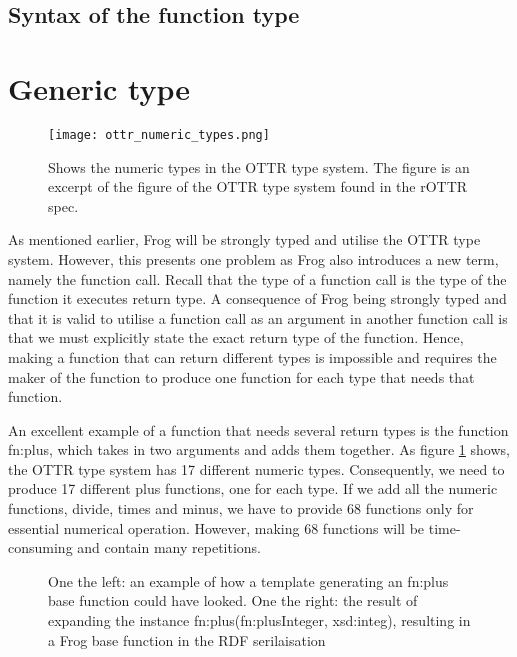 \subsection{Syntax of the function type}

\section{Generic type}

\begin{figure}[b]
    \centering
    \texttt{[image: ottr\_numeric\_types.png]}
    \caption{Shows the numeric types in the OTTR type system. The figure is an excerpt of the figure of the OTTR type system found in the rOTTR spec\cite{OTTR_rOTTR}.}
    \label{fig:ottr_numeric_types}
\end{figure}

As mentioned earlier, Frog will be strongly typed and utilise the OTTR type system. However, this presents one problem as Frog also introduces a new term, namely the function call. Recall that the type of a function call is the type of the function it executes return type. A consequence of Frog being strongly typed and that it is valid to utilise a function call as an argument in another function call is that we must explicitly state the exact return type of the function. Hence, making a function that can return different types is impossible and requires the maker of the function to produce one function for each type that needs that function. 

\para
An excellent example of a function that needs several return types is the function fn:plus, which takes in two arguments and adds them together. As figure \ref{fig:ottr_numeric_types} shows, the OTTR type system has 17 different numeric types. Consequently, we need to produce 17 different plus functions, one for each type. If we add all the numeric functions, divide, times and minus, we have to provide 68 functions only for essential numerical operation. However, making 68 functions will be time-consuming and contain many repetitions. 

\begin{figure}
    \begin{minipage}{.5\textwidth}
      \centering
      
    \end{minipage}
    \begin{minipage}{.5\textwidth}
      \centering
      
    \end{minipage}
    \caption{One the left: an example of how a template generating an fn:plus base function could have looked. One the right: the result of expanding the instance fn:plus(fn:plusInteger, xsd:integ), resulting in a Frog base function in the RDF serilaisation}
    \label{fig:generating_function_example}
\end{figure}

